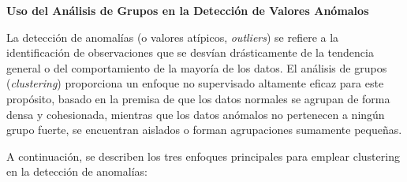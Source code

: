 \textbf{Uso del Análisis de Grupos en la Detección de Valores Anómalos}

La detección de anomalías (o valores atípicos, \textit{outliers}) se refiere a la identificación de observaciones que se desvían drásticamente de la tendencia general o del comportamiento de la mayoría de los datos. El análisis de grupos (\textit{clustering}) proporciona un enfoque no supervisado altamente eficaz para este propósito, basado en la premisa de que los datos normales se agrupan de forma densa y cohesionada, mientras que los datos anómalos no pertenecen a ningún grupo fuerte, se encuentran aislados o forman agrupaciones sumamente pequeñas.

A continuación, se describen los tres enfoques principales para emplear clustering en la detección de anomalías:


